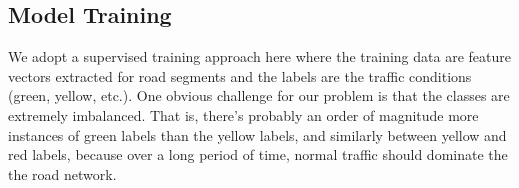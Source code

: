 \subsection{Model Training}
\label{sec:model}
We adopt a supervised training approach here where the training data are feature
vectors extracted for road segments and the labels are the traffic conditions
(green, yellow, etc.). One obvious challenge for our problem is that
the classes are extremely imbalanced. That is, there's probably an 
order of magnitude more instances of green labels than the yellow labels, and 
similarly between yellow and red labels, because over a long period of time,
normal traffic should dominate the the road network.



